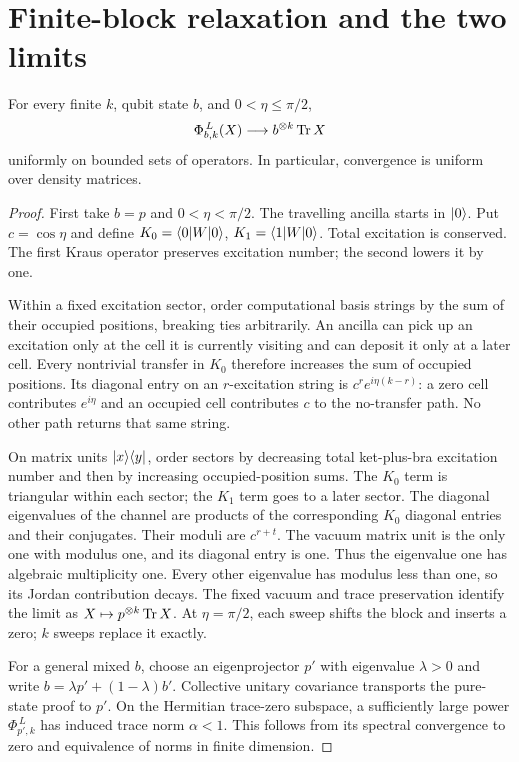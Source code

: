 \section{Finite-block relaxation and the two limits}\label{app:relaxation}

\begin{lemma}\label{lem:relaxation}
For every finite $k$, qubit state $b$, and $0<\eta\le\pi/2$,
\begin{equation}
 \Phi_{b,k}^{\,L}(X)\longrightarrow b^{\otimes k}\operatorname{Tr} X
 \label{eq:relaxation}
\end{equation}
uniformly on bounded sets of operators. In particular, convergence is uniform over density matrices.
\end{lemma}
\begin{proof}
First take $b=p$ and $0<\eta<\pi/2$. The travelling ancilla starts in $|0\rangle$. Put $c=\cos\eta$ and define $K_0=\langle0|W|0\rangle$, $K_1=\langle1|W|0\rangle$. Total excitation is conserved. The first Kraus operator preserves excitation number; the second lowers it by one.

Within a fixed excitation sector, order computational basis strings by the sum of their occupied positions, breaking ties arbitrarily. An ancilla can pick up an excitation only at the cell it is currently visiting and can deposit it only at a later cell. Every nontrivial transfer in $K_0$ therefore increases the sum of occupied positions. Its diagonal entry on an $r$-excitation string is $c^r e^{i\eta(k-r)}$: a zero cell contributes $e^{i\eta}$ and an occupied cell contributes $c$ to the no-transfer path. No other path returns that same string.

On matrix units $|x\rangle\langle y|$, order sectors by decreasing total ket-plus-bra excitation number and then by increasing occupied-position sums. The $K_0$ term is triangular within each sector; the $K_1$ term goes to a later sector. The diagonal eigenvalues of the channel are products of the corresponding $K_0$ diagonal entries and their conjugates. Their moduli are $c^{r+t}$. The vacuum matrix unit is the only one with modulus one, and its diagonal entry is one. Thus the eigenvalue one has algebraic multiplicity one. Every other eigenvalue has modulus less than one, so its Jordan contribution decays. The fixed vacuum and trace preservation identify the limit as $X\mapsto p^{\otimes k}\operatorname{Tr} X$. At $\eta=\pi/2$, each sweep shifts the block and inserts a zero; $k$ sweeps replace it exactly.

For a general mixed $b$, choose an eigenprojector $p'$ with eigenvalue $\lambda>0$ and write $b=\lambda p'+(1-\lambda)b'$. Collective unitary covariance transports the pure-state proof to $p'$. On the Hermitian trace-zero subspace, a sufficiently large power $\Phi_{p',k}^{\,L}$ has induced trace norm $\alpha<1$. This follows from its spectral convergence to zero and equivalence of norms in finite dimension.


\end{proof}
